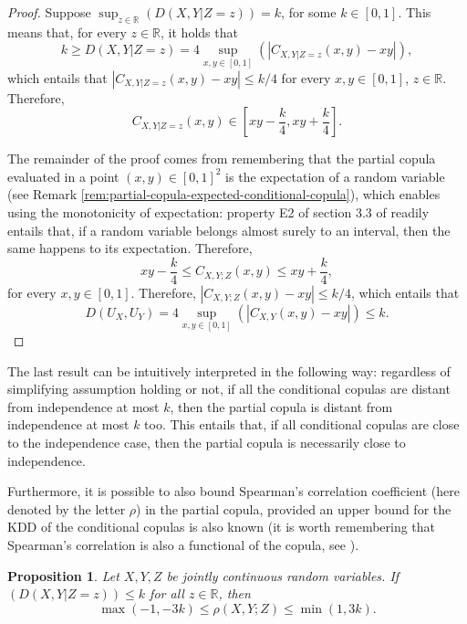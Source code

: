 \documentclass[
]{article}
\newtheorem{proposition}{Proposition}
\begin{document}
\begin{proof}
Suppose $\sup_{z \in \mathbb{R}}(D(X, Y | Z = z)) = k$, for some $k \in [0,1]$. This means that, for every $z \in \mathbb{R}$, it holds that
$$k \geq D(X, Y | Z = z) = 4 \sup_{x,y \in [0,1]} (|C_{X,Y|Z=z}(x, y) - xy|),$$
which entails that $|C_{X,Y|Z=z}(x, y) - xy| \leq k/4$ for every $x, y \in [0, 1]$, $z \in \mathbb{R}$. Therefore,
$$C_{X,Y|Z=z}(x, y) \in \left[xy - \frac{k}{4}, xy + \frac{k}{4}\right].$$

The remainder of the proof comes from remembering that the partial copula evaluated in a point $(x, y) \in [0, 1]^2$ is the expectation of a random variable (see Remark \ref{rem:partial-copula-expected-conditional-copula}), which enables using the monotonicity of expectation: property E2 of section 3.3 of \citet{james1981} readily entails that, if a random variable belongs almost surely to an interval, then the same happens to its expectation. Therefore,
$$xy - \frac{k}{4} \leq C_{X,Y;Z}(x, y) \leq xy + \frac{k}{4},$$
for every $x, y \in [0, 1]$. Therefore, $|C_{X,Y;Z}(x, y) - xy| \leq k/4$, which entails that
$$D(U_X, U_Y) = 4 \sup_{x,y \in [0,1]} (|C_{X,Y}(x, y) - xy|) \leq k.$$
\end{proof}

The last result can be intuitively interpreted in the following way:
regardless of simplifying assumption holding or not, if all the
conditional copulas are distant from independence at most \(k\), then
the partial copula is distant from independence at most \(k\) too. This
entails that, if all conditional copulas are close to the independence
case, then the partial copula is necessarily close to independence.

Furthermore, it is possible to also bound Spearman's correlation
coefficient (here denoted by the letter \(\rho\)) in the partial copula,
provided an upper bound for the KDD of the conditional copulas is also
known (it is worth remembering that Spearman's correlation is also a
functional of the copula, see \citet{fredricks2007}).

\begin{proposition}\label{def:spearman-bounds}
Let $X, Y, Z$ be jointly continuous random variables. If $(D(X, Y | Z = z)) \leq k$ for all $z \in \mathbb{R}$, then
$$\max(-1, -3k) \leq \rho(X, Y; Z) \leq \min(1, 3k).$$
\end{proposition}
\end{document}
